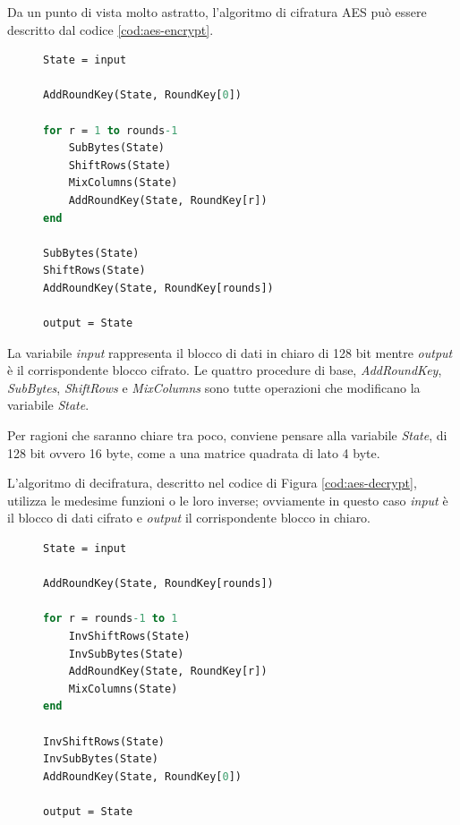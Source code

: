 \documentclass[12pt,a4paper,oneside]{book}
\begin{document}
Da un punto di vista molto astratto, l'algoritmo di cifratura \ac{AES} può essere descritto dal codice \ref{cod:aes-encrypt}.

\vspace*{10pt}
\begin{figure}
\begin{lstlisting}[caption=\textit{Procedura di cifratura AES.},label={cod:aes-encrypt},language=Pascal]
State = input

AddRoundKey(State, RoundKey[0])

for r = 1 to rounds-1
	SubBytes(State)
	ShiftRows(State)
	MixColumns(State)
	AddRoundKey(State, RoundKey[r])
end

SubBytes(State)
ShiftRows(State)
AddRoundKey(State, RoundKey[rounds])

output = State
\end{lstlisting}
\end{figure}

La variabile \textit{input} rappresenta il blocco di dati in chiaro di 128 bit mentre \textit{output} è il corrispondente blocco cifrato. Le quattro procedure di base, \textit{AddRoundKey}, \textit{SubBytes}, \textit{ShiftRows} e \textit{MixColumns} sono tutte operazioni che modificano la variabile \textit{State}.

Per ragioni che saranno chiare tra poco, conviene pensare alla variabile \textit{State}, di 128 bit ovvero 16 byte, come a una matrice quadrata di lato 4 byte.

L'algoritmo di decifratura, descritto nel codice di Figura \ref{cod:aes-decrypt}, utilizza le medesime funzioni o le loro inverse; ovviamente in questo caso \textit{input} è il blocco di dati cifrato e \textit{output} il corrispondente blocco in chiaro.

\vspace*{10pt}
\begin{figure}
\begin{lstlisting}[caption={\textit{Procedura di decifratura AES.}},label={cod:aes-decrypt},language=Pascal]
State = input

AddRoundKey(State, RoundKey[rounds])

for r = rounds-1 to 1
	InvShiftRows(State)
	InvSubBytes(State)
	AddRoundKey(State, RoundKey[r])
	MixColumns(State)
end

InvShiftRows(State)
InvSubBytes(State)
AddRoundKey(State, RoundKey[0])

output = State
\end{lstlisting}
\end{figure}
\end{document}
